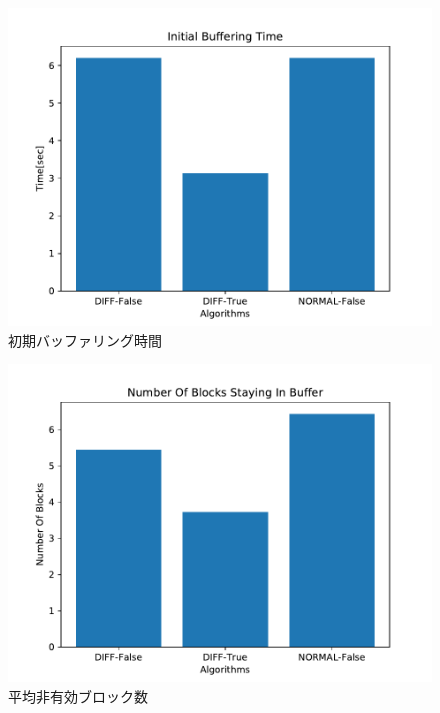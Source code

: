 \documentclass[a4j,12pt]{gradthesis_utf8}
\begin{document}
\newpage

\begin{figure}[h]
	\begin{center}
		\includegraphics[width=15cm]{figure/InitialBufferingTimePubIBRC.pdf}
		\caption{初期バッファリング時間}
		\label{ibtpub}
	\end{center}
\end{figure}

\newpage

\begin{figure}[h]
	\begin{center}
		\includegraphics[width=15cm]{figure/NumberOfBlocksStayingInBufferPubIBRC.pdf}
		\caption{平均非有効ブロック数}
		\label{nsbpub}
	\end{center}
\end{figure}
 
\end{document}
